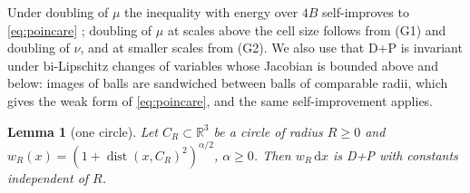 \documentclass[11pt]{amsart}
\newcommand{\R}{\mathbb{R}}
\newcommand{\dd}{\,\mathrm{d}}
\DeclareMathOperator{\dist}{dist}
\theoremstyle{plain}
\newtheorem{lemma}[theorem]{Lemma}
\theoremstyle{definition}
\theoremstyle{remark}
\begin{document}
Under doubling of $\mu$ the inequality with energy over $4B$ self-improves to
\eqref{eq:poincare} \cite[Thms.~5.1 and~9.7]{hajlaszkoskela2000}; doubling of $\mu$ at scales
above the cell size follows from (G1) and doubling of $\nu$, and at smaller
scales from (G2). We also use that D+P is invariant under bi-Lipschitz changes
of variables whose Jacobian is bounded above and below: images of balls are
sandwiched between balls of comparable radii, which gives the weak form of
\eqref{eq:poincare}, and the same self-improvement applies.

\begin{lemma}[one circle]\label{lem:circle}
Let $C_R\subset\R^3$ be a circle of radius $R\ge0$ and $w_R(x)=(1+\dist(x,C_R)^2)^{\alpha/2}$,
$\alpha\ge0$. Then $w_R\dd x$ is D+P with constants independent of $R$.
\end{lemma}
\end{document}
